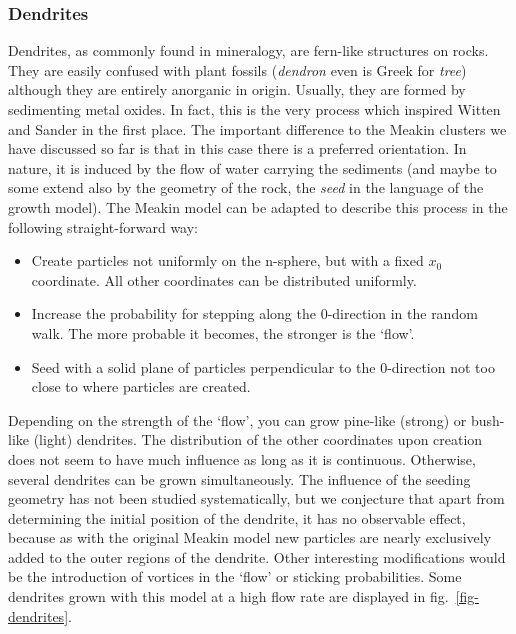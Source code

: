 \documentclass[twocolumn,10pt]{scrartcl}
\begin{document}
            \subsubsection{Dendrites}
                Dendrites, as commonly found in mineralogy, are fern-like structures on rocks. They are easily confused
                with plant fossils (\emph{dendron} even is Greek for \emph{tree}) although they are entirely anorganic
                in origin. Usually, they are formed by sedimenting metal oxides. In fact, this is the very process
                which inspired Witten and Sander in the first place. The important difference to the Meakin clusters
                we have discussed so far is that in this case there is a preferred orientation. In nature, it is
                induced by the flow of water carrying the sediments (and maybe to some extend also by the geometry
                of the rock, the \emph{seed} in the language of the growth model). The Meakin model can be adapted
                to describe this process in the following straight-forward way:
                \begin{itemize}
                    \item Create particles not uniformly on the n-sphere, but with a fixed $x_0$ coordinate. All other
                        coordinates can be distributed uniformly.
                    \item Increase the probability for stepping along the 0-direction in the random walk. The more
                        probable it becomes, the stronger is the `flow'.
                    \item Seed with a solid plane of particles perpendicular to the 0-direction not too close to where
                        particles are created.
                \end{itemize}
                Depending on the strength of the `flow', you can grow pine-like (strong) or bush-like (light) dendrites.
                The distribution of the other coordinates upon creation does not seem to have much influence as long
                as it is continuous. Otherwise, several dendrites can be grown simultaneously. The influence of the
                seeding geometry has not been studied systematically, but we conjecture that apart from determining the
                initial position of the dendrite, it has no observable effect, because as with the original Meakin model
                new particles are nearly exclusively added to the outer regions of the dendrite. Other interesting
                modifications would be the introduction of vortices in the `flow' or sticking probabilities.
                Some dendrites grown with this model at a high flow rate are displayed in fig.~\ref{fig-dendrites}.
\end{document}
